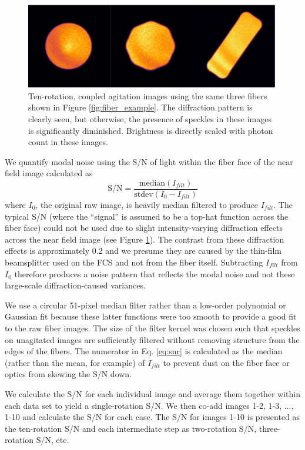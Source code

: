 \documentclass[twocolumn]{emulateapj}
\begin{document}
\begin{figure}
\centering
	\includegraphics[width=\columnwidth]{images/fiber_improved.pdf}
	\caption{Ten-rotation, coupled agitation images using the same three fibers shown in Figure \ref{fig:fiber_example}.  The diffraction pattern is clearly seen, but otherwise, the presence of speckles in these images is significantly diminished. Brightness is directly scaled with photon count in these images.}
\label{fig:fiber_improved}
\end{figure}

We quantify modal noise using the S/N of light within the fiber face of the near field image calculated as
\begin{equation}
\mathrm{S/N} = \frac{\mathrm{median}(I_{filt})}{\mathrm{stdev}(I_0 - I_{filt})}
\label{eq:snr}
\end{equation}
where $I_0$, the original raw image, is heavily median filtered to produce $I_{filt}$. The typical S/N (where the ``signal'' is assumed to be a top-hat function across the fiber face) could not be used due to slight intensity-varying diffraction effects across the near field image (see Figure \ref{fig:fiber_improved}). The contrast from these diffraction effects is approximately 0.2 and we presume they are caused by the thin-film beamsplitter used on the FCS and not from the fiber itself. Subtracting $I_{filt}$ from $I_0$ therefore produces a noise pattern that reflects the modal noise and not these large-scale diffraction-caused variances.

We use a circular 51-pixel median filter rather than a low-order polynomial or Gaussian fit because these latter functions were too smooth to provide a good fit to the raw fiber images. The size of the filter kernel was chosen such that speckles on unagitated images are sufficiently filtered without removing structure from the edges of the fibers. The numerator in Eq. \ref{eq:snr} is calculated as the median (rather than the mean, for example) of $I_{filt}$ to prevent dust on the fiber face or optics from skewing the S/N down.

We calculate the S/N for each individual image and average them together within each data set to yield a single-rotation S/N. We then co-add images 1-2, 1-3, ..., 1-10 and calculate the S/N for each case. The S/N for images 1-10 is presented as the ten-rotation S/N and each intermediate step as two-rotation S/N, three-rotation S/N, etc.
\end{document}
